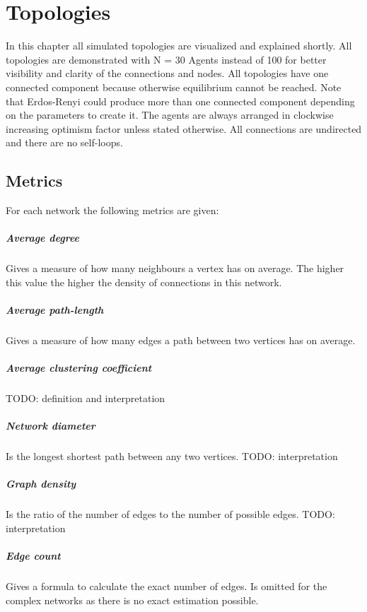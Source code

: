 \documentclass[Bachelorarbeit.tex]{subfiles}
\begin{document}
\graphicspath{{./figures/appendixTopologies/}}	%

\chapter{Topologies}
\label{app:topologies}
In this chapter all simulated topologies are visualized and explained shortly. All topologies are demonstrated with N = 30 Agents instead of 100 for better visibility and clarity of the connections and nodes. All topologies have one connected component because otherwise equilibrium cannot be reached. Note that Erdos-Renyi could produce more than one connected component depending on the parameters to create it. The agents are always arranged in clockwise increasing optimism factor unless stated otherwise. All connections are undirected and there are no self-loops.

\section{Metrics}
For each network the following metrics are given:

\paragraph{Average degree} Gives a measure of how many neighbours a vertex has on average. The higher this value the higher the density of connections in this network.
\paragraph{Average path-length} Gives a measure of how many edges a path between two vertices has on average.
\paragraph{Average clustering coefficient} TODO: definition and interpretation
\paragraph{Network diameter} Is the longest shortest path between any two vertices. TODO: interpretation
\paragraph{Graph density} Is the ratio of the number of edges to the number of possible edges. TODO: interpretation
\paragraph{Edge count} Gives a formula to calculate the exact number of edges. Is omitted for the complex networks as there is no exact estimation possible.
\end{document}
